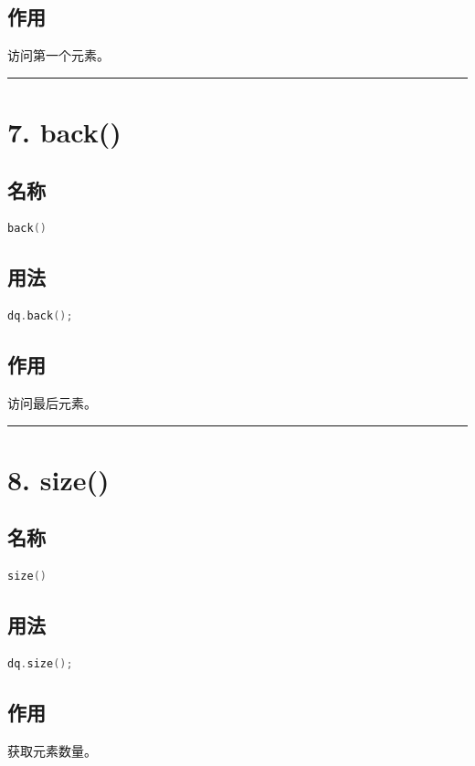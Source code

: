 \documentclass[10pt,twocolumn]{extarticle}
\begin{document}
\subsection{作用}
访问第一个元素。

\noindent\rule{\linewidth}{0.4pt}

\section{7. back()}

\subsection{名称}
\begin{lstlisting}[language=C++]
back()
\end{lstlisting}

\subsection{用法}
\begin{lstlisting}[language=C++]
dq.back();
\end{lstlisting}

\subsection{作用}
访问最后元素。

\noindent\rule{\linewidth}{0.4pt}

\section{8. size()}

\subsection{名称}
\begin{lstlisting}[language=C++]
size()
\end{lstlisting}

\subsection{用法}
\begin{lstlisting}[language=C++]
dq.size();
\end{lstlisting}

\subsection{作用}
获取元素数量。
\end{document}
